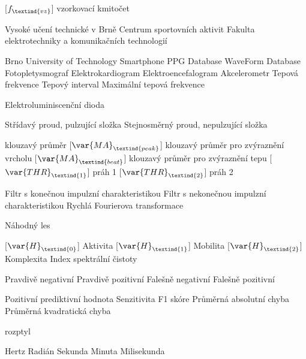 \cleardoublepage
\chapter*{\listofabbrevname}
{}

\begin{acronym}[KolikMista]	%

		[\ensuremath{f_\textind{vz}}]
		{vzorkovací kmitočet}

			{Vysoké učení technické v Brně}
			{Centrum sportovních aktivit}
			{Fakulta elektrotechniky a komunikačních technologií}

		{Brno University of Technology Smartphone PPG Database}
			{WaveForm Database}
			{Fotopletysmograf}
			{Elektrokardiogram}
			{Elektroencefalogram}
			{Akcelerometr}
			{Tepová frekvence}
			{Tepový interval}
			{Maximální tepová frekvence}

			{Elektroluminiscenční dioda}

			{Střídavý proud, pulzující složka}
			{Stejnosměrný proud, nepulzující složka}

			{klouzavý průměr}
		[\ensuremath{\var{MA}_\textind{peak}}]
			{klouzavý průměr pro zvýraznění vrcholu}
		[\ensuremath{\var{MA}_\textind{beat}}]
		{klouzavý průměr pro zvýraznění tepu}
		[\ensuremath{\var{THR}_\textind{1}}]
		{práh 1}
		[\ensuremath{\var{THR}_\textind{2}}]
		{práh 2}
	
			{Filtr s konečnou impulzní charakteristikou}
			{Filtr s nekonečnou impulzní charakteristikou}
			{Rychlá Fourierova transformace}

			{Náhodný les}

		[\ensuremath{\var{H}_\textind{0}}]
		{Aktivita}
		[\ensuremath{\var{H}_\textind{1}}]
		{Mobilita}
		[\ensuremath{\var{H}_\textind{2}}]
		{Komplexita}
			{Index spektrální čistoty}

			{Pravdivě negativní}	%
			{Pravdivě pozitivní}
			{Falešně negativní}
			{Falešně pozitivní}

			{Pozitivní prediktivní hodnota}
			{Senzitivita}
			{F1 skóre}
			{Průměrná absolutní chyba}
			{Průměrná kvadratická chyba}

			{rozptyl}

			{Hertz}
			{Radián}
			{Sekunda}
			{Minuta}
			{Milisekunda}


\end{acronym}

